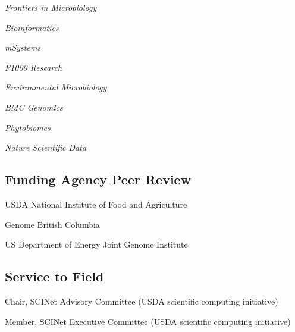 \documentclass[12pt,letterpaper]{report}
\newcommand{\listitemspace}{0.15em}
\renewenvironment{itemize}
{\begin{list}{}{\setlength{\leftmargin}{0em}
            \setlength{\parskip}{0em}
            \setlength{\itemsep}{\listitemspace}
            \setlength{\parsep}{\listitemspace}}}
    {\end{list}}
\begin{document}
    \begin{itemize}
        
        \item \textit{Frontiers in Microbiology}
        \item \textit{Bioinformatics}
        \item \textit{mSystems}
        \item \textit{F1000 Research}
        \item \textit{Environmental Microbiology}
        \item \textit{BMC Genomics}
        \item \textit{Phytobiomes}
        \item \textit{Nature Scientific Data}


    \end{itemize}


    \subsection*{Funding Agency Peer Review}

    \begin{itemize}

        \item USDA National Institute of Food and Agriculture

        \item Genome British Columbia
        
        \item US Department of Energy Joint Genome Institute

    \end{itemize}

    \subsection*{Service to Field}

    \begin{itemize}

        \item Chair, SCINet Advisory Committee (USDA scientific computing initiative)      
   
        \item Member, SCINet Executive Committee (USDA scientific computing initiative)     


    \end{itemize}
\end{document}
